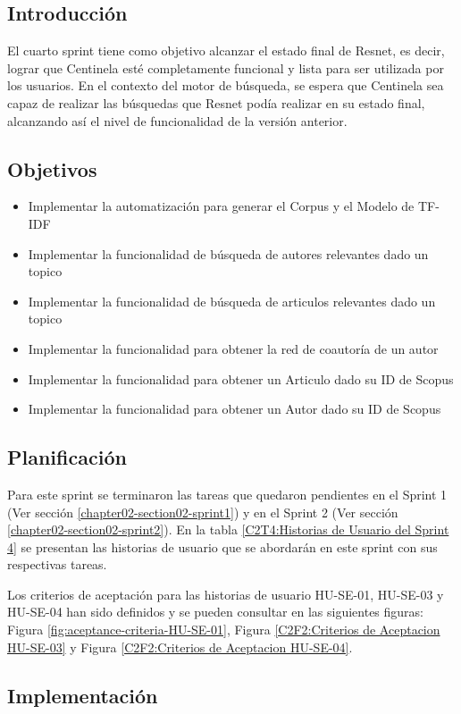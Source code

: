 \subsection{Introducción}
El cuarto sprint tiene como objetivo alcanzar el estado final de Resnet,
es decir, lograr que Centinela esté completamente funcional y lista para ser
utilizada por los usuarios. En el contexto del motor de búsqueda,
se espera que  Centinela sea capaz de realizar las búsquedas
que Resnet podía realizar en su estado final, alcanzando así el nivel de funcionalidad de la versión anterior.
\subsection{Objetivos}
\begin{itemize}
    \item Implementar la automatización para generar el Corpus y el Modelo de TF-IDF
    \item Implementar la funcionalidad de búsqueda de autores relevantes dado un topico
    \item Implementar la funcionalidad de búsqueda de articulos relevantes dado un topico
    \item Implementar la funcionalidad para obtener la red de coautoría de un autor
    \item Implementar la funcionalidad para obtener un Articulo dado su ID de Scopus
    \item Implementar la funcionalidad para obtener un Autor dado su ID de Scopus
\end{itemize}
\subsection{Planificación}
Para este sprint se terminaron las tareas que quedaron pendientes en el Sprint 1 (Ver sección \ref{chapter02-section02-sprint1})  y en el Sprint 2 (Ver sección \ref{chapter02-section02-sprint2}).
En la tabla \ref{C2T4:Historias de Usuario del Sprint 4} se presentan las historias de usuario que se abordarán en este sprint con sus respectivas tareas.


Los criterios de aceptación para las historias de usuario HU-SE-01, HU-SE-03 y HU-SE-04 han sido definidos y se pueden consultar en las siguientes figuras: Figura \ref{fig:aceptance-criteria-HU-SE-01}, Figura \ref{C2F2:Criterios de Aceptacion HU-SE-03} y Figura \ref{C2F2:Criterios de Aceptacion HU-SE-04}.
\subsection{Implementación}

